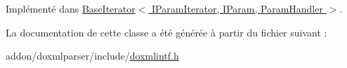 Implémenté dans \hyperlink{class_base_iterator_a93b9aedc8f3aed39e3d2a0fa6d70240d}{Base\+Iterator$<$ I\+Param\+Iterator, I\+Param, Param\+Handler $>$}.



La documentation de cette classe a été générée à partir du fichier suivant \+:\begin{DoxyCompactItemize}
\item 
addon/doxmlparser/include/\hyperlink{include_2doxmlintf_8h}{doxmlintf.\+h}\end{DoxyCompactItemize}
